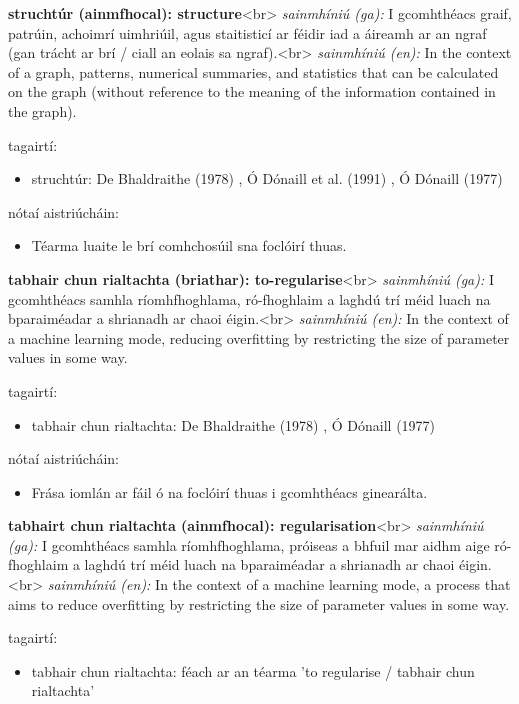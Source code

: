 \documentclass{article}
\begin{document}
\textbf{struchtúr (ainmfhocal): structure}<br>
\textit{sainmhíniú (ga):} I gcomhthéacs graif, patrúin, achoimrí uimhriúil, agus staitisticí ar féidir iad a áireamh ar an ngraf (gan trácht ar brí / ciall an eolais sa ngraf).<br>
\textit{sainmhíniú (en):} In the context of a graph, patterns, numerical summaries, and statistics that can be calculated on the graph (without reference to the meaning of the information contained in the graph).

tagairtí:
\begin{itemize}
	\item struchtúr: De Bhaldraithe (1978) \cite{de-bhaldraithe}, Ó Dónaill et al. (1991) \cite{focloir-beag}, Ó Dónaill (1977) \cite{odonaill}
\end{itemize}

nótaí aistriúcháin:
\begin{itemize}
	\item Téarma luaite le brí comhchosúil sna foclóirí thuas.
\end{itemize}


\textbf{tabhair chun rialtachta (briathar): to-regularise}<br>
\textit{sainmhíniú (ga):} I gcomhthéacs samhla ríomhfhoghlama, ró-fhoghlaim a laghdú trí méid luach na bparaiméadar a shrianadh ar chaoi éigin.<br>
\textit{sainmhíniú (en):} In the context of a machine learning mode, reducing overfitting by restricting the size of parameter values in some way.

tagairtí:
\begin{itemize}
	\item tabhair chun rialtachta: De Bhaldraithe (1978) \cite{de-bhaldraithe}, Ó Dónaill (1977) \cite{odonaill}
\end{itemize}

nótaí aistriúcháin:
\begin{itemize}
	\item Frása iomlán ar fáil ó na foclóirí thuas i gcomhthéacs ginearálta.
\end{itemize}


\textbf{tabhairt chun rialtachta (ainmfhocal): regularisation}<br>
\textit{sainmhíniú (ga):} I gcomhthéacs samhla ríomhfhoghlama, próiseas a bhfuil mar aidhm aige ró-fhoghlaim a laghdú trí méid luach na bparaiméadar a shrianadh ar chaoi éigin.<br>
\textit{sainmhíniú (en):} In the context of a machine learning mode, a process that aims to reduce overfitting by restricting the size of parameter values in some way.

tagairtí:
\begin{itemize}
	\item tabhair chun rialtachta: féach ar an téarma 'to regularise / tabhair chun rialtachta'
\end{itemize}
\end{document}
